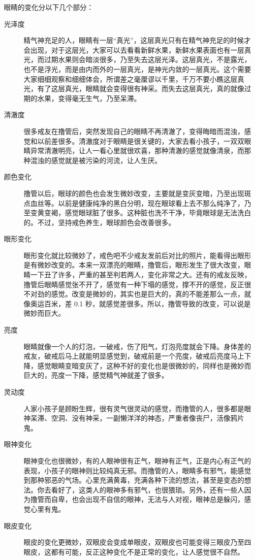 眼睛的变化分以下几个部分：
\begin{description}
    \item[光泽度] 精气神充足的人，眼睛有一层“真光”，这层真光只有在精气神充足的时候才会出现，对于这层光，大家可以去看看新鲜水果，新鲜水果表面也有一层真光，而过期水果则会暗淡很多，乃至失去这层光泽。这层真光，不是露光，也不是浮光，而是由内而外的一层真光，是神光内敛的一层真光。这个需要大家细细观察和细细体会，所谓差之毫厘谬以千里，千万不要小瞧这层真光，有了这层真光，眼睛就会变得很有神采。而失去这层真光，真的就像过期的水果，变得毫无生气，乃至呆滞。
    \item[清澈度] 很多戒友在撸管后，突然发现自己的眼睛不再清澈了，变得晦暗而混浊，感觉和以前差很多。清澈度对于眼睛是很关键的，大家去看小孩子，一双双眼睛异常清澈明亮，让人一看心里就很欢喜，那种清澈的感觉就像清泉，而那种混浊的感觉就是被污染的河流，让人生厌。
    \item[颜色变化] 撸管以后，眼球的颜色也会发生微妙改变，主要就是变灰变暗，乃至出现斑点血丝等。以前是健康纯净的黑白分明，现在眼球看上去不那么纯净了，乃至变黄变褐，感觉眼球脏了很多。这种脏也洗不干净，毕竟眼球是无法洗白的。不过，坚持戒色养生，眼球颜色会改善很多。
    \item[眼形变化] 眼形变化就比较微妙了，戒色吧不少戒友发前后对比的照片，能看得出眼形是有微妙改变的。本来一双漂亮的眼睛，撸管后，眼形发生了很大改变，眼睛一下丑了许多，严重的甚至判若两人，变化非常之大。还有的戒友反映，撸管后眼睛感觉张不开了，感觉有一种下塌的感觉，撑不开的感觉，反正很不对劲的感觉。改变是微妙的，其实也是巨大的，真的不能差那么一点，就像奥运百米，差 0.1 秒，就感觉差很多。所以，撸管导致的改变，可以说是微妙而巨大。
    \item[亮度] 眼睛就像一个人的灯泡，一破戒，伤了阳气，灯泡亮度就会下降。身体差的戒友，破戒后马上就能明显感觉到，破戒前是一个亮度，破戒后亮度马上下降，感觉眼睛变暗变灰了，这种不好的变化也是很微妙的，同样也是微妙而巨大的，亮度一下降，感觉精气神就差了很多。
    \item[灵动度] 人家小孩子是顾盼生辉，很有灵气很灵动的感觉，而撸管的人，很多都是眼神呆滞、空洞、没有神采，一副懒洋洋的神态，严重者像丧尸，活像鸦片鬼。
    \item[眼神变化] 眼神变化也很微妙，有的人眼神很有正气，眼神有正气，正是内心有正气的表现，小孩子的眼神则比较纯真无邪。而撸管的人，眼睛多有邪气，能感觉到那种邪恶的气场。心里充满黄毒，充满各种下流的想法，甚至是变态的想法。你去看好了，这类人的眼神多有邪气，也很猥琐。另外，还有一些人因为撸管而自卑，也会出现不自信的眼神，无法与人对视，眼神总是躲闪，感觉心里有鬼。
    \item[眼皮变化] 眼皮的变化更微妙，双眼皮会变成单眼皮，双眼皮也可能变得三眼皮乃至四眼皮，这都有可能，反正这种变化不是正常的变化，让人感觉很不自然。

\end{description}
